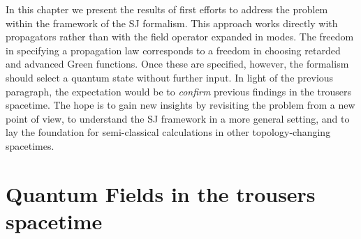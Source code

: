 \documentclass[12pt]{article}
\begin{document}
In this chapter we present the results of first efforts to address the problem within the framework of the SJ formalism. This approach works directly with propagators rather than with the field operator expanded in modes. The freedom in specifying a propagation law corresponds to a freedom in choosing retarded and advanced Green functions. Once these are specified, however, the formalism should select a quantum state without further input. In light of the previous paragraph, the expectation would be to \emph{confirm} previous findings in the trousers spacetime. The hope is to gain new insights by revisiting the problem from a new point of view, to understand the SJ framework in a more general setting, and to lay the foundation for semi-classical calculations in other topology-changing spacetimes.\\





\section{Quantum Fields in the trousers spacetime}\label{sec:qftintrousers}
\end{document}
